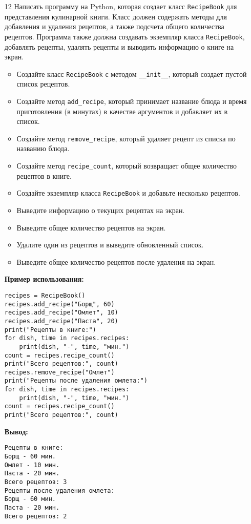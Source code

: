 \begin{enumerate}
\item[12] Написать программу на Python, которая создает класс \texttt{RecipeBook} для представления кулинарной книги. Класс должен содержать методы для добавления и удаления рецептов, а также подсчета общего количества рецептов. Программа также должна создавать экземпляр класса \texttt{RecipeBook}, добавлять рецепты, удалять рецепты и выводить информацию о книге на экран.

\begin{itemize}
    \item Создайте класс \texttt{RecipeBook} с методом \texttt{\_\_init\_\_}, который создает пустой список рецептов.
    \item Создайте метод \texttt{add\_recipe}, который принимает название блюда и время приготовления (в минутах) в качестве аргументов и добавляет их в список.
    \item Создайте метод \texttt{remove\_recipe}, который удаляет рецепт из списка по названию блюда.
    \item Создайте метод \texttt{recipe\_count}, который возвращает общее количество рецептов в книге.
    \item Создайте экземпляр класса \texttt{RecipeBook} и добавьте несколько рецептов.
    \item Выведите информацию о текущих рецептах на экран.
    \item Выведите общее количество рецептов на экран.
    \item Удалите один из рецептов и выведите обновленный список.
    \item Выведите общее количество рецептов после удаления на экран.
\end{itemize}

\textbf{Пример использования:}

\begin{verbatim}
recipes = RecipeBook()
recipes.add_recipe("Борщ", 60)
recipes.add_recipe("Омлет", 10)
recipes.add_recipe("Паста", 20)
print("Рецепты в книге:")
for dish, time in recipes.recipes:
    print(dish, "-", time, "мин.")
count = recipes.recipe_count()
print("Всего рецептов:", count)
recipes.remove_recipe("Омлет")
print("Рецепты после удаления омлета:")
for dish, time in recipes.recipes:
    print(dish, "-", time, "мин.")
count = recipes.recipe_count()
print("Всего рецептов:", count)
\end{verbatim}

\textbf{Вывод:}
\begin{verbatim}
Рецепты в книге:
Борщ - 60 мин.
Омлет - 10 мин.
Паста - 20 мин.
Всего рецептов: 3
Рецепты после удаления омлета:
Борщ - 60 мин.
Паста - 20 мин.
Всего рецептов: 2
\end{verbatim}


\end{enumerate}
